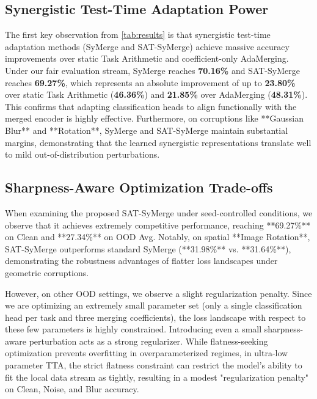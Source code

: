 \documentclass{article}
\begin{document}
\subsection{Synergistic Test-Time Adaptation Power}
The first key observation from \cref{tab:results} is that synergistic test-time adaptation methods (SyMerge and SAT-SyMerge) achieve massive accuracy improvements over static Task Arithmetic and coefficient-only AdaMerging. Under our fair evaluation stream, SyMerge reaches \textbf{70.16\%} and SAT-SyMerge reaches \textbf{69.27\%}, which represents an absolute improvement of up to \textbf{23.80\%} over static Task Arithmetic (\textbf{46.36\%}) and \textbf{21.85\%} over AdaMerging (\textbf{48.31\%}). This confirms that adapting classification heads to align functionally with the merged encoder is highly effective. Furthermore, on corruptions like **Gaussian Blur** and **Rotation**, SyMerge and SAT-SyMerge maintain substantial margins, demonstrating that the learned synergistic representations translate well to mild out-of-distribution perturbations.

\subsection{Sharpness-Aware Optimization Trade-offs}
When examining the proposed SAT-SyMerge under seed-controlled conditions, we observe that it achieves extremely competitive performance, reaching **69.27\%** on Clean and **27.34\%** on OOD Avg. Notably, on spatial **Image Rotation**, SAT-SyMerge outperforms standard SyMerge (**31.98\%** vs. **31.64\%**), demonstrating the robustness advantages of flatter loss landscapes under geometric corruptions.

However, on other OOD settings, we observe a slight regularization penalty. Since we are optimizing an extremely small parameter set (only a single classification head per task and three merging coefficients), the loss landscape with respect to these few parameters is highly constrained. Introducing even a small sharpness-aware perturbation acts as a strong regularizer. While flatness-seeking optimization prevents overfitting in overparameterized regimes, in ultra-low parameter TTA, the strict flatness constraint can restrict the model's ability to fit the local data stream as tightly, resulting in a modest "regularization penalty" on Clean, Noise, and Blur accuracy.
\end{document}
